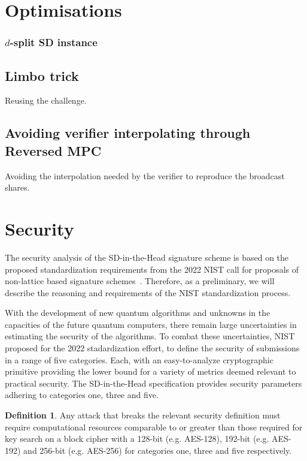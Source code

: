 \documentclass[11pt]{report}
\theoremstyle{definition}
\newtheorem{definition}{Definition}[section]
\theoremstyle{plain}
\begin{document}
\section{Optimisations}

\subsubsection{$d$-split SD instance}

\subsection{Limbo trick}

Reusing the challenge.

\subsection{Avoiding verifier interpolating through Reversed MPC}

Avoiding the interpolation needed by the verifier to reproduce the broadcast shares.

\section{Security}

The security analysis of the SD-in-the-Head signature scheme is based on the proposed standardization requirements from the 2022 NIST call for proposals of non-lattice based signature schemes~\cite{nistcall}. Therefore, as a preliminary, we will describe the reasoning and requirements of the NIST standardization process.

With the development of new quantum algorithms and unknowns in the capacities of the future quantum computers, there remain large uncertainties in estimating the security of the algorithms. To combat these uncertainties, NIST proposed for the 2022 stadardization effort, to define the security of submissions in a range of five categories. Each, with an easy-to-analyze cryptographic primitive providing the lower bound for a variety of metrics deemed relevant to practical security. The SD-in-the-Head specification provides security parameters adhering to categories one, three and five.

\begin{definition}\label{def:nistsec}
  Any attack that breaks the relevant security definition must require computational resources comparable to or greater than those required for key search on a block cipher with a 128-bit (e.g. AES-128), 192-bit (e.g. AES-192) and 256-bit (e.g. AES-256) for categories one, three and five respectively.
\end{definition}
\end{document}
